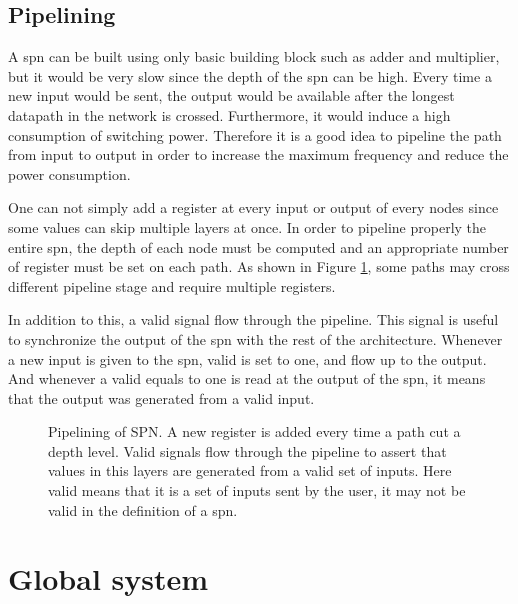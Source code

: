 \subsection{Pipelining}
A \gls{spn} can be built using only basic building block such as adder and multiplier, but it would be very slow since the depth of the \gls{spn} can be high. Every time a new input would be sent, the output would be available after the longest datapath in the network is crossed. Furthermore, it would induce a high consumption of switching power. Therefore it is a good idea to pipeline the path from input to output in order to increase the maximum frequency and reduce the power consumption.

One can not simply add a register at every input or output of every nodes since some values can skip multiple layers at once. In order to pipeline properly the entire \gls{spn}, the depth of each node must be computed and an appropriate number of register must be set on each path. As shown in Figure \ref{fig:pip}, some paths may cross different pipeline stage and require multiple registers.

In addition to this, a valid signal flow through the pipeline. This signal is useful to synchronize the output of the \gls{spn} with the rest of the architecture. Whenever a new input is given to the \gls{spn}, valid is set to one, and flow up to the output. And whenever a valid equals to one is read at the output of the \gls{spn}, it means that the output was generated from a valid input.

\begin{figure}[!ht]
\begin{mdframed}
	\centering
	
	\caption{Pipelining of SPN. A new register is added every time a path cut a depth level. Valid signals flow through the pipeline to assert that values in this layers are generated from a valid set of inputs. Here valid means that it is a set of inputs sent by the user, it may not be valid in the definition of a \gls{spn}.}
	\label{fig:pip}
\end{mdframed}
\end{figure}


\section{Global system}

